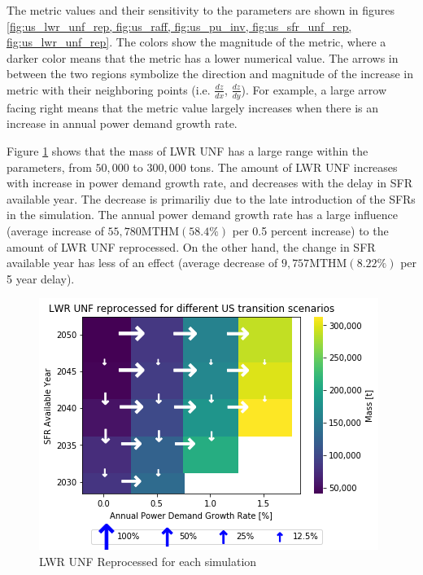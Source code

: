 The metric values and their sensitivity to the parameters are shown in figures
\ref{fig:us_lwr_unf_rep, fig:us_raff, fig:us_pu_inv, fig:us_sfr_unf_rep, fig:us_lwr_unf_rep}.
The colors show the magnitude of the metric, where a darker color means that the metric has a
lower numerical value. The arrows in between the two regions symbolize the direction and magnitude
of the increase in metric with their neighboring points (i.e. $\frac{dz}{dx}$, $\frac{dz}{dy}$). For example, a large arrow facing right
means that the metric value largely increases when there is an increase in annual power
demand growth rate.

Figure \ref{fig:us_lwr_unf_rep} shows that the mass of \gls{LWR} \gls{UNF} has a large
range within the parameters, from $50,000$ to $300,000$ tons. 
The amount of \gls{LWR} \gls{UNF} increases with increase
in power demand growth rate, and decreases with the delay in
\gls{SFR} available year. The decrease is primariliy due to
the late introduction of the \glspl{SFR} in the simulation. The annual power demand
growth rate has a large influence (average increase of $55,780 \text{MTHM} (58.4 \%)$ 
per 0.5 percent increase) to the amount of \gls{LWR} \gls{UNF}
reprocessed. On the other hand, the change in  \gls{SFR} available year
has less of an effect (average decrease of $9,757 \text{MTHM} (8.22\%)$
per 5 year delay).


\begin{figure}[htbp!]
    \begin{center}
        \includegraphics[scale=0.7]{./images/us/scat_both_LWR_UNF_reprocessed.png}
    \end{center}
        \caption{\gls{LWR} \gls{UNF} Reprocessed for each simulation}
    \label{fig:us_lwr_unf_rep}
\end{figure}



